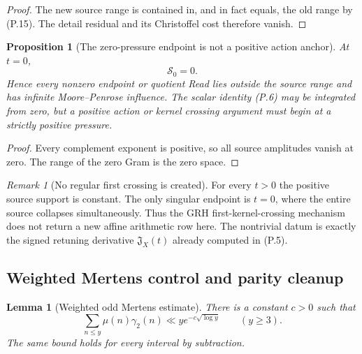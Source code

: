 \documentclass[11pt]{article}
\newtheorem{proposition}[theorem]{Proposition}
\newtheorem{lemma}[theorem]{Lemma}
\theoremstyle{definition}
\theoremstyle{remark}
\newtheorem{remark}[theorem]{Remark}
\begin{document}
\begin{proof}
The new source range is contained in, and in fact equals, the old range by
\textup{(P.15)}.  The detail residual and its Christoffel cost therefore
vanish.
\end{proof}

\begin{proposition}[The zero-pressure endpoint is not a positive action anchor]
\label{cth:affpress-zero-anchor}
At $t=0$,
\[
 \boxed{\mathscr S_0=0.}
\]
Hence every nonzero endpoint or quotient Read lies outside the source range
and has infinite Moore--Penrose influence.  The scalar identity
\textup{(P.6)} may be integrated from zero, but a positive action or kernel
crossing argument must begin at a strictly positive pressure.
\end{proposition}

\begin{proof}
Every complement exponent is positive, so all source amplitudes vanish at
zero.  The range of the zero Gram is the zero space.
\end{proof}

\begin{remark}[No regular first crossing is created]
For every $t>0$ the positive source support is constant.  The only singular
endpoint is $t=0$, where the entire source collapses simultaneously.  Thus the
GRH first-kernel-crossing mechanism does not return a new affine arithmetic
row here.  The nontrivial datum is exactly the signed retuning derivative
$\mathfrak J_X(t)$ already computed in \textup{(P.5)}.
\end{remark}

\subsection{Weighted Mertens control and parity cleanup}
\label{subsec:affpress-parity-cleanup}

\begin{lemma}[Weighted odd Mertens estimate]
\label{lem:affpress-weighted-Mertens}
There is a constant $c>0$ such that
\begin{equation}
 \label{eq:affpress-weighted-Mertens}
 \boxed{
 \sum_{n\le y}\mu(n)\gamma_2(n)
 \ll ye^{-c\sqrt{\log y}}
 \qquad(y\ge3).}
 \tag{P.18}
\end{equation}
The same bound holds for every interval by subtraction.
\end{lemma}
\end{document}
